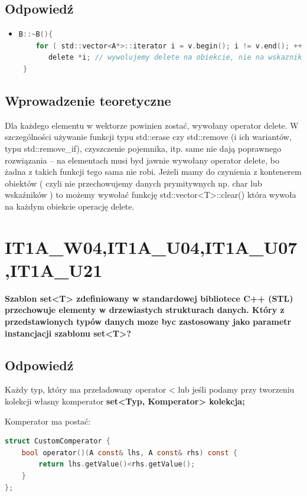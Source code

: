 \subsection{Odpowiedź}
\begin{itemize}
\item 
\begin{lstlisting}[language=c]
 B::~B(){
    for ( std::vector<A*>::iterator i = v.begin(); i != v.end(); ++i )
       delete *i; // wywolujemy delete na obiekcie, nie na wskazniku do niego!
 }
\end{lstlisting}
\end{itemize}

\subsection{Wprowadzenie teoretyczne}
Dla każdego elementu w wektorze powinien zostać, wywołany operator delete. W szczególności używanie funkcji typu std::erase czy std::remove (i ich wariantów, typu std::remove\_if), czyszczenie pojemnika, itp. same nie dają poprawnego rozwiązania – na elementach musi byd jawnie wywołany operator delete, bo żadna z takich funkcji tego sama nie robi. Jeżeli mamy do czynienia z kontenerem obiektów ( czyli nie przechowujemy danych prymitywnych np. char lub wskaźników ) to możemy wywołać funkcję std::vector<T>::clear() która wywoła na każdym obiekcie operację delete.


\section{IT1A\_W04,IT1A\_U04,IT1A\_U07,IT1A\_U21}
\textbf{Szablon set<T> zdefiniowany w standardowej bibliotece C++ (STL) przechowuje elementy w drzewiastych strukturach danych. Który z przedstawionych typów danych moze byc zastosowany jako parametr instancjacji szablonu set<T>? }

\subsection{Odpowiedź}
Każdy typ, który ma przeładowany operator < lub jeśli podamy przy tworzeniu kolekcji własny komperator
\textbf{set<Typ, Komperator> kolekcja;}

Komperator ma postać:
\begin{lstlisting}[language=c]
struct CustomComperator {
	bool operator()(A const& lhs, A const& rhs) const {
		return lhs.getValue()<rhs.getValue();
	}
};
\end{lstlisting}

